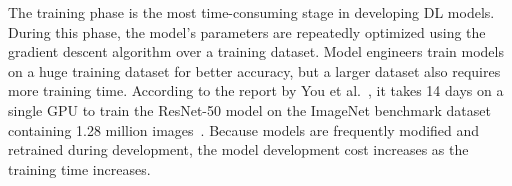 
The training phase is the most time-consuming stage in developing DL models. 
During this phase, the model's parameters are repeatedly optimized using the
gradient descent algorithm over a training dataset.
Model engineers train models on a huge training dataset for better accuracy,
but a larger dataset also requires more training time.
According to the report by You et al.~\cite{imagenettraining2017}, it takes 14
days on a single GPU to train the ResNet-50 model on the ImageNet benchmark
dataset containing 1.28 million images~\cite{imagenet2014}.
Because models are frequently modified and retrained during development, the
model development cost increases as the training time increases.

